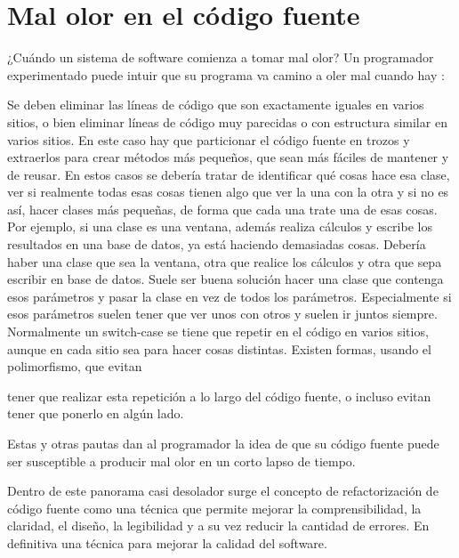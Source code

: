 \section{Mal olor en el código fuente}
¿Cuándo un sistema de software comienza a tomar mal olor? Un programador
experimentado puede intuir que su programa va camino a oler mal
cuando hay \cite{REF03}:


\begin{enumerate}[label=\textbf{\arabic*}.]
 Se deben eliminar las líneas de código que son exactamente
iguales en varios sitios, o bien eliminar líneas de código muy
parecidas o con estructura similar en varios sitios.
 En este caso hay que particionar el código fuente
en trozos y extraerlos para crear métodos más pequeños, que sean más
fáciles de mantener y de reusar.
 En estos casos se debería tratar de identificar
qué cosas hace esa clase, ver si realmente todas esas cosas tienen algo
que ver la una con la otra y si no es así, hacer clases más pequeñas, de
forma que cada una trate una de esas cosas. Por ejemplo, si una clase
es una ventana, además realiza cálculos y escribe los resultados en una
base de datos, ya está haciendo demasiadas cosas. Debería haber una
clase que sea la ventana, otra que realice los cálculos y otra que sepa
escribir en base de datos.
 Suele ser buena solución
hacer una clase que contenga esos parámetros y pasar la clase en vez
de todos los parámetros. Especialmente si esos parámetros suelen tener
que ver unos con otros y suelen ir juntos siempre.
 Normalmente un switch-case se tiene que
repetir en el código en varios sitios, aunque en cada sitio sea para hacer
cosas distintas. Existen formas, usando el polimorfismo, que evitan

tener que realizar esta repetición a lo largo del código fuente, o incluso
evitan tener que ponerlo en algún lado.

\end{enumerate}

Estas y otras pautas dan al programador la idea de que su código fuente
puede ser susceptible a producir mal olor en un corto lapso de tiempo.

Dentro de este panorama casi desolador surge el concepto de refactorización
de código fuente como una técnica que permite mejorar la comprensibilidad,
la claridad, el diseño, la legibilidad y a su vez reducir la cantidad de
errores. En definitiva una técnica para mejorar la calidad del software.

